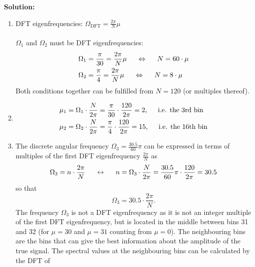 \documentclass[11pt,a4paper,DIV=12]{scrartcl}
\begin{document}
\begin{Loesung}
\textbf{Solution:}
\begin{enumerate}[label=\alph*)]
	\item DFT eigenfrequencies: $\Omega_\text{DFT}=\frac{2\pi}{N}\mu$\\\\
	$\Omega_1$ and $\Omega_2$ must be DFT eigenfrequencies:
%
	\begin{align}
	\Omega_1&=\frac{\pi}{30}=\frac{2\pi}{N}\mu \hspace{5mm}\Leftrightarrow\hspace{5mm} N=60\cdot\mu\nonumber\\
	\Omega_2&=\frac{\pi}{4}=\frac{2\pi}{N}\mu \hspace{5mm}\Leftrightarrow\hspace{5mm} N=8\cdot\mu\nonumber
	\end{align}
%
	Both conditions together can be fulfilled from $N=120$ (or multiples thereof).
%
	\item \begin{align}
	\mu_1&=\Omega_1\cdot\frac{N}{2\pi}=\frac{\pi}{30}\cdot\frac{120}{2\pi}=2, \hspace{5mm}\text{i.e. the 3rd bin}\nonumber\\
	\mu_2&=\Omega_2\cdot\frac{N}{2\pi}=\frac{\pi}{4}\cdot\frac{120}{2\pi}=15, \hspace{5mm}\text{i.e. the 16th bin}\nonumber
	\end{align}
%
	\item The discrete angular frequency $\Omega_3=\frac{30.5}{60}\pi$ can be
	expressed in terms of multiples of the first DFT eigenfrequency
	$\frac{2\pi}{N}$ as
%
	\begin{equation}
	\Omega_3=n\cdot\frac{2\pi}{N} \hspace{5mm}\leftrightarrow\hspace{5mm} n=\Omega_3\cdot\frac{N}{2\pi}=\frac{30.5}{60}\pi\cdot\frac{120}{2\pi}=30.5\nonumber
	\end{equation}
%
	so that
%
	\begin{equation}
	\Omega_3=30.5\cdot\frac{2\pi}{N}.\nonumber
	\end{equation}
%
	The frequency $\Omega_3$ is not a DFT eigenfrequency as it is not an integer
	multiple of the first DFT eigenfrequency, but is located in the middle between
	bins 31 and 32 (for $\mu=30$ and $\mu=31$ counting from $\mu=0$).
%
	The neighbouring bins are the bins that can give the best information about
	the amplitude of the true signal.
%
	The spectral values at the neighbouring bins can be calculated by the DFT of

\end{enumerate}
\end{Loesung}
\end{document}

